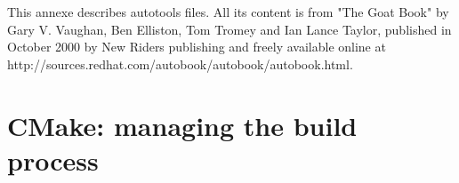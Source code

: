 


This annexe describes autotools files. All its content is from "The Goat Book"
by Gary V. Vaughan, Ben Elliston, Tom Tromey and Ian Lance Taylor, published 
in October 2000 by New Riders publishing and freely available online at 
http://sources.redhat.com/autobook/autobook/autobook.html.


\section{CMake: managing the build process}

